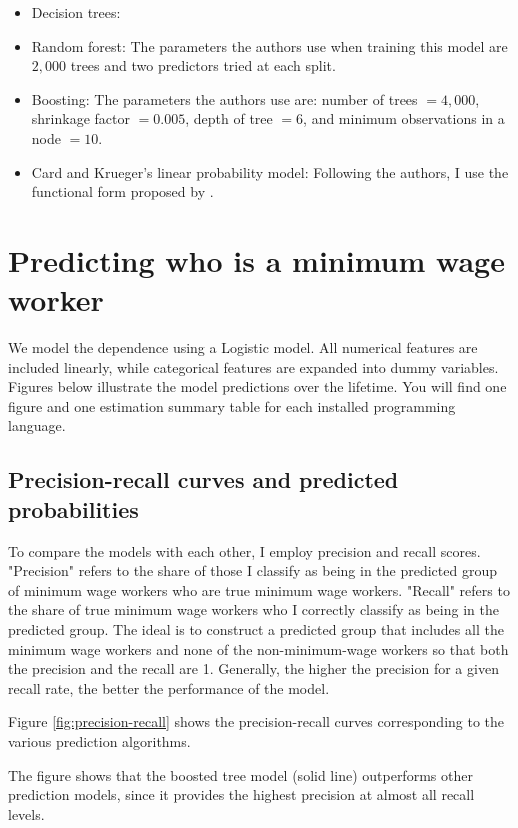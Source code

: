 \documentclass[11pt, a4paper, leqno]{article}
\begin{document}
\begin{itemize}
\item Decision trees: 
\item Random forest: The parameters the authors use when training this model are
$2,000$ trees and two predictors tried at each split.
\item Boosting: The parameters the authors use are: number of trees $= 4,000$, 
shrinkage factor $= 0.005$, depth of tree $=6$, and minimum observations in a node $=10$.
\item Card and Krueger's linear probability model: Following the authors, I use 
the functional form proposed by \citet{card2016myth}. 
\end{itemize}

\section{Predicting who is a minimum wage worker} %
\label{sec:prediction}

We model the dependence using a Logistic model. All
numerical features are included linearly, while categorical features are expanded into
dummy variables. Figures below illustrate the model predictions over the lifetime. You
will find one figure and one estimation summary table for each installed programming
language.

\subsection{Precision-recall curves and predicted probabilities}

To compare the models with each other, I employ precision and recall scores. 
"Precision" refers to the share of those I
classify as being in the predicted group of minimum wage workers who are true minimum wage workers.
"Recall" refers to the share of true minimum wage workers who I correctly
classify as being in the predicted group. The ideal is to construct a predicted group that includes
all the minimum wage workers and none of the non-minimum-wage
workers so that both the precision and the recall are 1. Generally, the higher
the precision for a given recall rate, the better the performance of the model.

Figure \ref{fig:precision-recall} shows the precision-recall curves corresponding to the various
prediction algorithms. 

The ﬁgure shows that the boosted tree model (solid line) outperforms other
prediction models, since it provides the highest precision at almost all recall
levels. 
\end{document}
